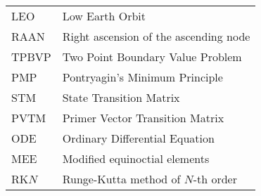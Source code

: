 \begin{longtable}{ll}
LEO & Low Earth Orbit \\
RAAN & Right ascension of the ascending node \\
TPBVP & Two Point Boundary Value Problem \\
PMP & Pontryagin's Minimum Principle \\
STM & State Transition Matrix \\
PVTM & Primer Vector Transition Matrix \\
ODE & Ordinary Differential Equation \\
MEE & Modified equinoctial elements \\
RK\(N\) & Runge-Kutta method of \(N\)-th order
\end{longtable}

